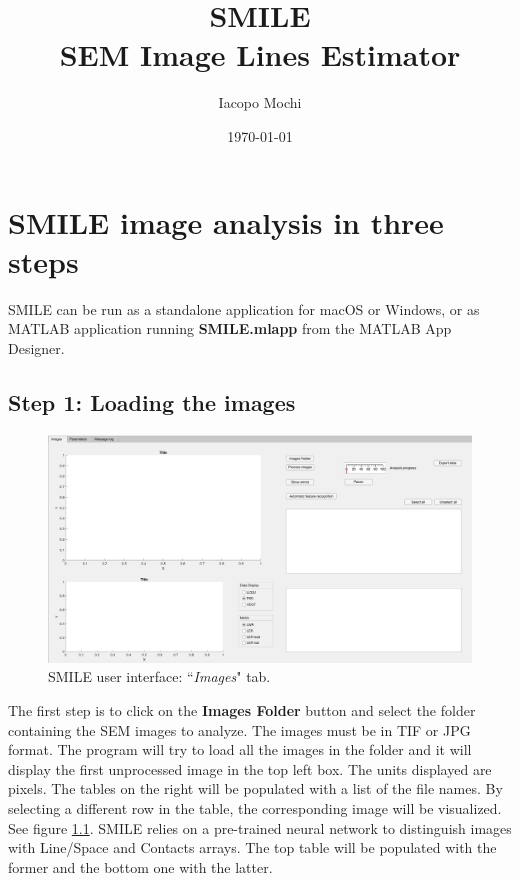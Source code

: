 \documentclass[12pt, a4paper, openany]{report}
\begin{document}
\title{SMILE\\
SEM Image Lines Estimator}
\author{Iacopo Mochi}
\date{\today}

\maketitle


\chapter{SMILE image analysis in three steps}
SMILE can  be run as a standalone application for macOS or Windows, or as MATLAB application running \textbf{SMILE.mlapp} from the MATLAB App Designer.
\section{Step 1: Loading the images}
\begin{figure}[hbtp]
	\includegraphics[width=\textwidth]{figures/GUI_01.png}
	\caption{SMILE user interface: ``\emph{Images}" tab.}
	\label{fig:GUI_01}
\end{figure}
The first step is to click on the \textbf{Images Folder} button and select the folder containing the SEM images to analyze. The images must be in TIF or JPG format. The program will try to load all the images in the folder and it will display the first unprocessed image in the top left box. The units displayed are pixels. The tables on the right will be populated with a list of the file names. By selecting a different row in the table, the corresponding image will be visualized. See figure \ref{fig:GUI_01}. SMILE relies on a pre-trained neural network to distinguish images with Line/Space and Contacts arrays. The top table will be populated with the former and the bottom one with the latter.
\end{document}
